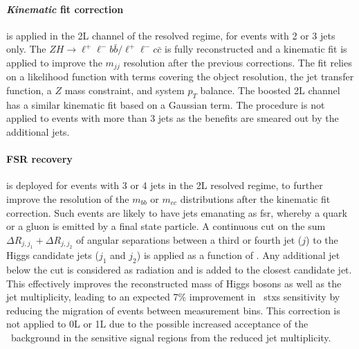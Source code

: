 \paragraph{\textit{Kinematic} fit correction} is applied in the 2L channel of the resolved regime, for events with 2 or 3 jets only. The $ZH \rightarrow \ell^+\ell^- b\bar{b} / \ell^+\ell^- c\bar{c}$ is fully reconstructed and a kinematic fit is applied to improve the $m_{jj}$ resolution after the previous corrections. The fit relies on a likelihood function with terms covering the object resolution, the jet transfer function, a $Z$ mass constraint, and system $p_T$ balance. The boosted 2L channel has a similar kinematic fit based on a Gaussian term. The procedure is not applied to events with more than 3 jets as the benefits are smeared out by the additional jets. %

\paragraph{FSR recovery} is deployed for events with 3 or 4 jets in the 2L resolved regime, to further improve the resolution of the $m_{bb}$ or $m_{cc}$ distributions after the kinematic fit correction. Such events are likely to have jets emanating as \gls{fsr}, whereby a quark or a gluon is emitted by a final state particle. A continuous cut on the sum $\Delta R_{j, j_1} + \Delta R_{j, j_2}$ of angular separations between a third or fourth jet ($j$) to the Higgs candidate jets ($j_1$ and $j_2$) is applied as a function of \ptv. Any additional jet below the cut is considered as radiation and is added to the closest candidate jet. This effectively improves the reconstructed mass of Higgs bosons as well as the jet multiplicity, leading to an expected 7\% improvement in \vhb\ \gls{stxs} sensitivity by reducing the migration of events between measurement bins. This correction is not applied to 0L or 1L due to the possible increased acceptance of the \ttb\ background in the sensitive signal regions from the reduced jet multiplicity.
